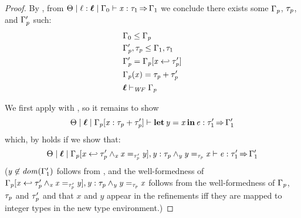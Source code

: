 \begin{proof}
  By , from $ \Theta   \mid   \ell  \ottsym{:}  \oldvec{\ell}   \mid   \Gamma_{{\mathrm{0}}}   \vdash   \mathit{x}  :  \tau_{{\mathrm{1}}}   \produces   \Gamma_{{\mathrm{1}}} $ we conclude there
  exists some $\Gamma_{\mathit{p}}$, $\tau_{\mathit{p}}$, and $\Gamma'_{\mathit{p}}$ such:
  \begin{align}
    & \Gamma_{{\mathrm{0}}}  \leq  \Gamma_{\ottmv{p}} \label{eqn:rin-sub} \\
    & \Gamma'_{\ottmv{p}}  \ottsym{,}  \tau_{\ottmv{p}}  \leq  \Gamma_{{\mathrm{1}}}  \ottsym{,}  \tau_{{\mathrm{1}}} \label{eqn:rout-sub} \\
    & \Gamma'_{\ottmv{p}}  \ottsym{=}  \Gamma_{\ottmv{p}}  \ottsym{[}  \mathit{x}  \hookleftarrow  \tau'_{\ottmv{p}}  \ottsym{]} \label{eqn:gp-up-def} \\
    & \Gamma_{\ottmv{p}}  \ottsym{(}  \mathit{x}  \ottsym{)}  \ottsym{=}  \tau_{\ottmv{p}}  \ottsym{+}  \tau'_{\ottmv{p}} \label{eqn:gp-x-def} \\
    &  \oldvec{\ell}   \vdash _{\wf}  \Gamma_{\ottmv{p}}  \label{eqn:renv-sub-in-wf}
  \end{align} 

  We first apply  with , so it remains to show
  \[
     \Theta   \mid   \oldvec{\ell}   \mid   \Gamma_{\ottmv{p}}  \ottsym{[}  \mathit{x}  \ottsym{:}  \tau_{\ottmv{p}}  \ottsym{+}  \tau'_{\ottmv{p}}  \ottsym{]}   \vdash    \LET  \mathit{y}  =  \mathit{x}  \IN  \ottnt{e}   :  \tau'_{{\mathrm{1}}}   \produces   \Gamma'_{{\mathrm{1}}} 
  \]
  which, by  holds if we show that:
  \[
     \Theta   \mid   \oldvec{\ell}   \mid   \Gamma_{\ottmv{p}}  \ottsym{[}  \mathit{x}  \hookleftarrow   \tau'_{\ottmv{p}}  \wedge_{ \mathit{x} }   \mathit{x}  =_{ \tau'_{\ottmv{p}} }  \mathit{y}    \ottsym{]}  \ottsym{,}  \mathit{y}  \ottsym{:}   \tau_{\ottmv{p}}  \wedge_{ \mathit{y} }   \mathit{y}  =_{ \tau_{\ottmv{p}} }  \mathit{x}     \vdash   \ottnt{e}  :  \tau'_{{\mathrm{1}}}   \produces   \Gamma'_{{\mathrm{1}}} 
  \]
  ($ \mathit{y}  \not\in   \mathit{dom}( \Gamma'_{{\mathrm{1}}} )  $ follows from , and the well-formedness of
  $\Gamma_{\mathit{p}}  [  \mathit{x}  \hookleftarrow   \tau'_{\mathit{p}}  \wedge_{ \mathit{x} }   \mathit{x}  =_{ \tau'_{\mathit{p}} }  \mathit{y}    ]  ,  \mathit{y}  :   \tau_{\mathit{p}}  \wedge_{ \mathit{y} }   \mathit{y}  =_{ \tau_{\mathit{p}} }  \mathit{x}  $ follows from the well-formedness of
  $\Gamma_{\mathit{p}}$, $\tau_{\mathit{p}}$ and $\tau'_{\mathit{p}}$ and that $\mathit{x}$ and $\mathit{y}$ appear in the refinements
  iff they are mapped to integer types in the new type environment.)
    

\end{proof}
